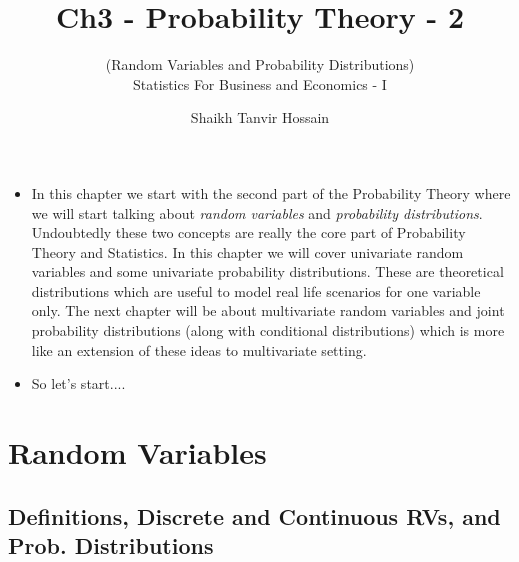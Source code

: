 \documentclass[8pt, usepdftitle = false]{beamer}
\title{\LARGE Ch3 - Probability Theory - 2}
\subtitle{{\fontsize{10}{10}\selectfont\color{gray!50!balck} 
(Random Variables and Probability Distributions)} \\
\vspace*{.2cm} Statistics For Business and Economics - I}
\author{Shaikh Tanvir Hossain\vspace*{-.4cm}}
\institute{ East West University, Dhaka\\ Last Updated \today}
\date{\vspace{-5pt}}
\begin{document}



\begin{frame}[allowframebreaks]{}

\begin{itemize}
\item In this chapter we start with the second part of the Probability Theory where we will start talking about \emph{random variables} and \emph{probability distributions}. Undoubtedly these two concepts are really the core part of Probability Theory and Statistics. In this chapter we will cover univariate random variables and some univariate probability distributions. These are theoretical distributions which are useful to \alert{model} real life scenarios for one variable only. The next chapter will be about multivariate random variables and joint probability distributions (along with conditional distributions) which is more like an extension of these ideas to multivariate setting.

\item So let's start...\faWalking \faWalking \faWalking.

\end{itemize}

\end{frame}



\section{Random Variables}
\frame{\sectionpage}

\subsection{Definitions, Discrete and Continuous RVs, and Prob. Distributions}
\frame{\subsectionpage}
\end{document}
